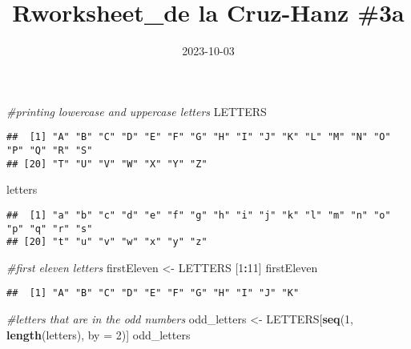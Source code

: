 \documentclass[
]{article}
\title{Rworksheet\_de la Cruz-Hanz \#3a}
\author{}
\date{\vspace{-2.5em}2023-10-03}
\newenvironment{Shaded}{\begin{snugshade}}{\end{snugshade}}
\newcommand{\AttributeTok}[1]{\textcolor[rgb]{0.13,0.29,0.53}{#1}}
\newcommand{\CommentTok}[1]{\textcolor[rgb]{0.56,0.35,0.01}{\textit{#1}}}
\newcommand{\DecValTok}[1]{\textcolor[rgb]{0.00,0.00,0.81}{#1}}
\newcommand{\FunctionTok}[1]{\textcolor[rgb]{0.13,0.29,0.53}{\textbf{#1}}}
\newcommand{\NormalTok}[1]{#1}
\newcommand{\OtherTok}[1]{\textcolor[rgb]{0.56,0.35,0.01}{#1}}
\newcommand{\SpecialCharTok}[1]{\textcolor[rgb]{0.81,0.36,0.00}{\textbf{#1}}}
\begin{document}
\maketitle

\begin{Shaded}
\begin{Highlighting}[]
\CommentTok{\#printing lowercase and uppercase letters}
\NormalTok{LETTERS}
\end{Highlighting}
\end{Shaded}

\begin{verbatim}
##  [1] "A" "B" "C" "D" "E" "F" "G" "H" "I" "J" "K" "L" "M" "N" "O" "P" "Q" "R" "S"
## [20] "T" "U" "V" "W" "X" "Y" "Z"
\end{verbatim}

\begin{Shaded}
\begin{Highlighting}[]
\NormalTok{letters}
\end{Highlighting}
\end{Shaded}

\begin{verbatim}
##  [1] "a" "b" "c" "d" "e" "f" "g" "h" "i" "j" "k" "l" "m" "n" "o" "p" "q" "r" "s"
## [20] "t" "u" "v" "w" "x" "y" "z"
\end{verbatim}

\begin{Shaded}
\begin{Highlighting}[]
\CommentTok{\#first eleven letters}
\NormalTok{firstEleven }\OtherTok{\textless{}{-}}\NormalTok{ LETTERS [}\DecValTok{1}\SpecialCharTok{:}\DecValTok{11}\NormalTok{]}
\NormalTok{firstEleven}
\end{Highlighting}
\end{Shaded}

\begin{verbatim}
##  [1] "A" "B" "C" "D" "E" "F" "G" "H" "I" "J" "K"
\end{verbatim}

\begin{Shaded}
\begin{Highlighting}[]
\CommentTok{\#letters that are in the odd numbers}
\NormalTok{odd\_letters }\OtherTok{\textless{}{-}}\NormalTok{ LETTERS[}\FunctionTok{seq}\NormalTok{(}\DecValTok{1}\NormalTok{, }\FunctionTok{length}\NormalTok{(letters), }\AttributeTok{by =} \DecValTok{2}\NormalTok{)]}
\NormalTok{odd\_letters}
\end{Highlighting}
\end{Shaded}
\end{document}

